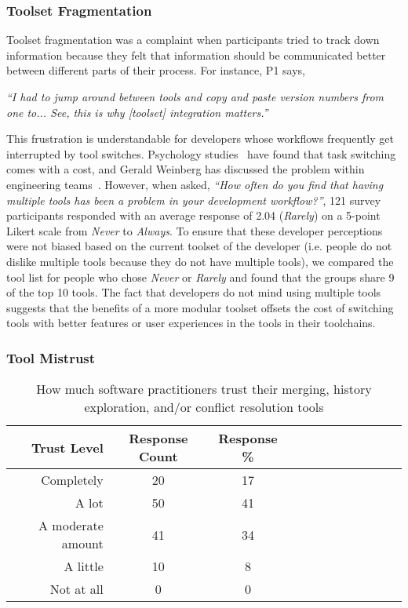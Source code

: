 \subsubsection{Toolset Fragmentation}

Toolset fragmentation was a complaint when participants tried to track down information because they felt that information should be communicated better between different parts of their process. For instance, P1 says, 

\begin{displayquote}
\textit{``I had to jump around between tools and copy and paste version numbers from one to... See, this is why [toolset] integration matters.''}
\end{displayquote}

This frustration is understandable for developers whose workflows frequently get interrupted by tool switches. Psychology studies~\cite{Meiran2000}\cite{gopher2000switching} have found that task switching comes with a cost, and Gerald Weinberg has discussed the problem within engineering teams~\cite{Weinberg1992}. However, when asked, \textit{``How often do you find that having multiple tools has been a problem in your development workflow?''}, 121 survey participants responded with an average response of 2.04 (\textit{Rarely}) on a 5-point Likert scale from \textit{Never} to \textit{Always}. 
To ensure that these developer perceptions were not biased based on the current toolset of the developer (i.e. people do not dislike multiple tools because they do not have multiple tools), we compared the tool list for people who chose \textit{Never} or \textit{Rarely} and found that the groups share 9 of the top 10 tools. The fact that developers do not mind using multiple tools suggests that the benefits of a more modular toolset offsets the cost of switching tools with better features or user experiences in the tools in their toolchains. 

\subsubsection{Tool Mistrust}

\begin{table}[!]
\renewcommand{\arraystretch}{1.3}
\caption{How much software practitioners trust their merging, history exploration, and/or conflict resolution tools}
\label{survey_tool_trust}
\centering
\begin{tabularx}{0.45\textwidth}{@{}r|*{10}{C}c@{}}
\toprule
Trust Level & Response Count & Response \%\\
\midrule
Completely & 20 & 17\\
A lot & 50 & 41\\
A moderate amount & 41 & 34\\
A little & 10 & 8\\
Not at all & 0 & 0\\
\bottomrule
\end{tabularx}
\end{table}

